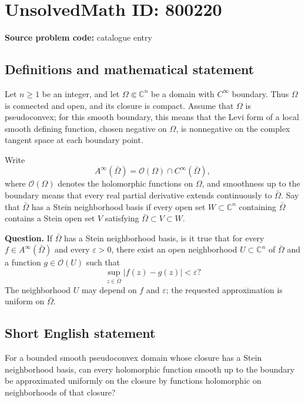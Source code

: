 \documentclass[11pt]{article}
\newcommand{\C}{\mathbb{C}}
\begin{document}
\section*{UnsolvedMath ID: 800220}
\textbf{Source problem code:} catalogue entry
\subsection{Definitions and mathematical statement}
Let \(n\geq 1\) be an integer, and let \(\Omega\Subset\C^n\) be a domain with \(C^\infty\) boundary. Thus \(\Omega\) is connected and open, and its closure is compact. Assume that \(\Omega\) is pseudoconvex; for this smooth boundary, this means that the Levi form of a local smooth defining function, chosen negative on \(\Omega\), is nonnegative on the complex tangent space at each boundary point.

Write
\[
A^\infty(\bar\Omega)=\mathcal O(\Omega)\cap C^\infty(\bar\Omega),
\]
where \(\mathcal O(\Omega)\) denotes the holomorphic functions on \(\Omega\), and smoothness up to the boundary means that every real partial derivative extends continuously to \(\bar\Omega\). Say that \(\bar\Omega\) has a Stein neighborhood basis if every open set \(W\subset\C^n\) containing \(\bar\Omega\) contains a Stein open set \(V\) satisfying \(\bar\Omega\subset V\subset W\).

\textbf{Question.} If \(\bar\Omega\) has a Stein neighborhood basis, is it true that for every \(f\in A^\infty(\bar\Omega)\) and every \(\varepsilon>0\), there exist an open neighborhood \(U\subset\C^n\) of \(\bar\Omega\) and a function \(g\in\mathcal O(U)\) such that
\[
\sup_{z\in\bar\Omega}|f(z)-g(z)|<\varepsilon?
\]
The neighborhood \(U\) may depend on \(f\) and \(\varepsilon\); the requested approximation is uniform on \(\bar\Omega\).
\subsection{Short English statement}
For a bounded smooth pseudoconvex domain whose closure has a Stein neighborhood basis, can every holomorphic function smooth up to the boundary be approximated uniformly on the closure by functions holomorphic on neighborhoods of that closure?
\end{document}
